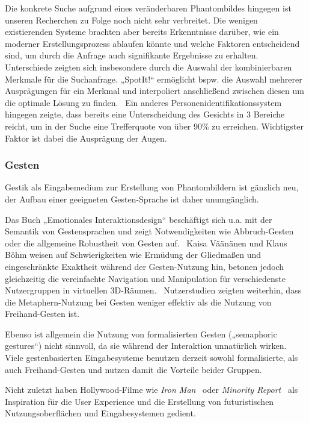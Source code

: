 \documentclass{sigchi-ext}
\begin{document}
Die konkrete Suche aufgrund eines veränderbaren Phantombildes hingegen ist unseren Recherchen zu Folge noch nicht sehr verbreitet. Die wenigen existierenden Systeme brachten aber bereits Erkenntnisse darüber, wie ein moderner Erstellungsprozess ablaufen könnte und welche Faktoren entscheidend sind, um durch die Anfrage auch signifikante Ergebnisse zu erhalten.
Unterschiede zeigten sich insbesondere durch die Auswahl der
kombinierbaren Merkmale für die Suchanfrage. „SpotIt!“ ermöglicht
bspw. die Auswahl mehrerer Ausprägungen für ein Merkmal und interpoliert anschließend zwischen diesen um die optimale Lösung zu finden.~\cite{brunelli1996} Ein anderes Personenidentifikationssystem hingegen zeigte, dass bereits eine Unterscheidung des Gesichts in 3 Bereiche reicht, um in der Suche eine Trefferquote von über 90\% zu erreichen. Wichtigster Faktor ist dabei die Ausprägung der Augen. ~\cite{bobulski2012}

\subsubsection{Gesten}
Gestik als Eingabemedium zur Erstellung von Phantombildern ist gänzlich neu, der Aufbau einer geeigneten Gesten-Sprache ist daher unumgänglich. 

Das Buch „Emotionales Interaktionsdesign“ beschäftigt sich
 u.a. mit der Semantik von Gestensprachen und zeigt Notwendigkeiten wie Abbruch-Gesten oder die allgemeine Robustheit von Gesten auf.~\cite{Dorau11} Kaisa Väänänen und Klaus Böhm weisen auf Schwierigkeiten wie Ermüdung der Gliedmaßen und eingeschränkte Exaktheit während der Gesten-Nutzung hin, betonen jedoch gleichzeitig die vereinfachte Navigation und Manipulation für verschiedenste Nutzergruppen in virtuellen 3D-Räumen.~\cite{vrs:book}
Nutzerstudien zeigten weiterhin, dass die
Metaphern-Nutzung bei Gesten weniger effektiv als die Nutzung von
Freihand-Gesten ist.~\cite{3dinteraction:book}

Ebenso ist allgemein die Nutzung von formalisierten Gesten („semaphoric gestures“) nicht sinnvoll, da sie während der Interaktion unnatürlich wirken.~\cite{Quek:2002:MHD:568513.568514, Wexelblat:1997:RCG:647590.728557}
Viele gestenbasierten Eingabesysteme benutzen derzeit sowohl formalisierte, als auch
Freihand-Gesten und nutzen damit die Vorteile beider Gruppen.~\cite{3dinteraction:book}

Nicht zuletzt haben Hollywood-Filme wie \textit{Iron Man}~\cite{ironman:movie} oder \textit{Minority Report}~\cite{minorityreport:movie} als Inspiration für die User Experience und die Erstellung von futuristischen Nutzungsoberflächen und Eingabesystemen gedient.
\end{document}
